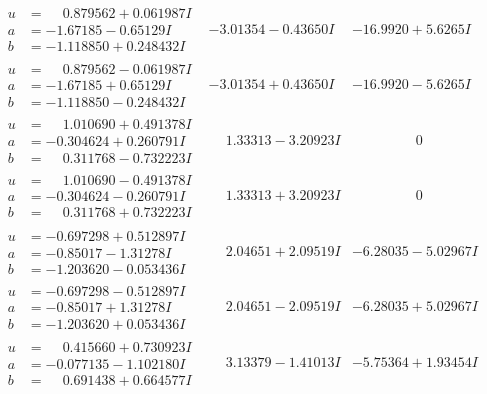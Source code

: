 \documentclass[1p]{elsarticle_modified}
\theoremstyle{definition}
\begin{document}
$$\begin{array}{c|c|c}
\begin{aligned}
u &= \phantom{-}0.879562 + 0.061987 I \\
a &= -1.67185 - 0.65129 I \\
b &= -1.118850 + 0.248432 I\end{aligned}
 & -3.01354 - 0.43650 I & -16.9920 + 5.6265 I \\ \hline\begin{aligned}
u &= \phantom{-}0.879562 - 0.061987 I \\
a &= -1.67185 + 0.65129 I \\
b &= -1.118850 - 0.248432 I\end{aligned}
 & -3.01354 + 0.43650 I & -16.9920 - 5.6265 I \\ \hline\begin{aligned}
u &= \phantom{-}1.010690 + 0.491378 I \\
a &= -0.304624 + 0.260791 I \\
b &= \phantom{-}0.311768 - 0.732223 I\end{aligned}
 & \phantom{-}1.33313 - 3.20923 I & \phantom{-0.000000 } 0 \\ \hline\begin{aligned}
u &= \phantom{-}1.010690 - 0.491378 I \\
a &= -0.304624 - 0.260791 I \\
b &= \phantom{-}0.311768 + 0.732223 I\end{aligned}
 & \phantom{-}1.33313 + 3.20923 I & \phantom{-0.000000 } 0 \\ \hline\begin{aligned}
u &= -0.697298 + 0.512897 I \\
a &= -0.85017 - 1.31278 I \\
b &= -1.203620 - 0.053436 I\end{aligned}
 & \phantom{-}2.04651 + 2.09519 I & -6.28035 - 5.02967 I \\ \hline\begin{aligned}
u &= -0.697298 - 0.512897 I \\
a &= -0.85017 + 1.31278 I \\
b &= -1.203620 + 0.053436 I\end{aligned}
 & \phantom{-}2.04651 - 2.09519 I & -6.28035 + 5.02967 I \\ \hline\begin{aligned}
u &= \phantom{-}0.415660 + 0.730923 I \\
a &= -0.077135 - 1.102180 I \\
b &= \phantom{-}0.691438 + 0.664577 I\end{aligned}
 & \phantom{-}3.13379 - 1.41013 I & -5.75364 + 1.93454 I \\ \hline\begin{aligned}

\end{aligned}
\end{array}$$
\end{document}
